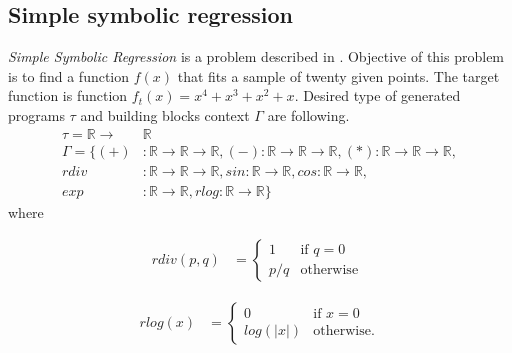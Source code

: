 \documentclass[conference]{IEEEtran}
\newcommand{\ar}{\rightarrow\xspace}
\newcommand{\Real}{\mathbb{R}}
\begin{document}
\subsection{Simple symbolic regression}
\textit{Simple Symbolic Regression} is a problem described
in \cite{koza92}. Objective of this problem is to 
find a function $f(x)$ that fits a sample
of twenty given points. The target function is 
function $f_{t}(x) = x^4 + x^3 + x^2 + x$.  
Desired type of generated programs $\tau$ and 
building blocks context $\Gamma$ are following.
\begin{align*}
\tau = \Real \ar &\Real\\
\Gamma = \{
  (+)  &: \Real \ar \Real \ar \Real    ,
  (-)   : \Real \ar \Real \ar \Real    ,
  (*)   : \Real \ar \Real \ar \Real    ,\\
  rdiv &: \Real \ar \Real \ar \Real    ,
  sin   : \Real \ar \Real              ,
  cos   : \Real \ar \Real              ,\\
  exp  &: \Real \ar \Real              , 
  rlog  : \Real \ar \Real              \}
\end{align*}
where

\noindent
\begin{minipage}{.5\linewidth}
\begin{align*}
rdiv(p,q) &= \begin{cases} 1 &\mbox{if } q = 0 \\
p/q & \mbox{otherwise } \end{cases}  
\end{align*}
\end{minipage}%

\begin{minipage}{.5\linewidth}
\begin{align*}
rlog(x) &= \begin{cases} 0 &\mbox{if } x = 0 \\
log(\vert x\vert) & \mbox{otherwise}. \end{cases}
\end{align*}
\end{minipage}
\end{document}
